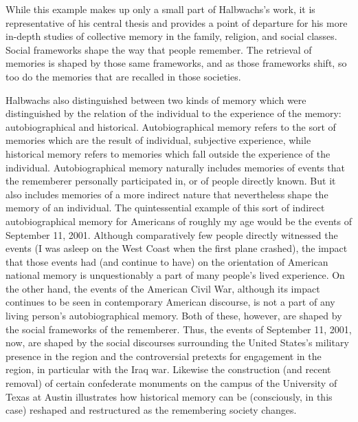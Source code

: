 While this example makes up only a small part of Halbwachs's work, it is
representative of his central thesis and provides a point of departure
for his more in-depth studies of collective memory in the family,
religion, and social classes. Social frameworks shape the way that
people remember. The retrieval of memories is shaped by those same
frameworks, and as those frameworks shift, so too do the memories that
are recalled in those societies.

Halbwachs also distinguished between two kinds of memory which were
distinguished by the relation of the individual to the experience of the
memory: autobiographical and historical. Autobiographical memory refers
to the sort of memories which are the result of individual, subjective
experience, while historical memory refers to memories which fall
outside the experience of the individual. Autobiographical memory
naturally includes memories of events that the rememberer personally
participated in, or of people directly known. But it also includes
memories of a more indirect nature that nevertheless shape the memory of
an individual. The quintessential example of this sort of indirect
autobiographical memory for Americans of roughly my age would be the
events of September 11, 2001. Although comparatively few people directly
witnessed the events (I was asleep on the West Coast when the first
plane crashed), the impact that those events had (and continue to have)
on the orientation of American national memory is unquestionably a part
of many people's lived experience. On the other hand, the events of the
American Civil War, although its impact continues to be seen in
contemporary American discourse, is not a part of any living person's
autobiographical memory.\autocite[19]{olick_olick-etal2011} Both of
these, however, are shaped by the social frameworks of the rememberer.
Thus, the events of September 11, 2001, now, are shaped by the social
discourses surrounding the United States's military presence in the
region and the controversial pretexts for engagement in the region, in
particular with the Iraq war. Likewise the construction (and recent
removal) of certain confederate monuments on the campus of the
University of Texas at Austin illustrates how historical memory can be
(consciously, in this case) reshaped and restructured as the remembering
society changes.

